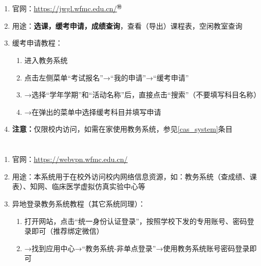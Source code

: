 \section[教务系统]{\textbf{}}
\begin{enumerate}
      \item 官网：\uline{\href{https://jwgl.wfmc.edu.cn/}{https://jwgl.wfmc.edu.cn/}$^㊕$}
      \item 用途：\textbf{选课，缓考申请，成绩查询}，查看（导出）课程表，空闲教室查询
      \item 缓考申请教程：
            \begin{enumerate}
                  \item 进入教务系统
                  \item 点击左侧菜单“考试报名”→“我的申请”→“缓考申请”
                  \item →选择“学年学期”和“活动名称”后，直接点击“搜索”（不要填写科目名称）
                  \item →在弹出的菜单中选择缓考科目并填写申请\footnotemark
            \end{enumerate}
      \item \textbf{注意：}仅限校内访问，如需在家使用教务系统，参见\uline{\ref{cas_system}}条目
\end{enumerate}

\section[资源访问控制系统（校内VPN）]{\textbf{}\footnotemark}
\label{cas_system}
\begin{enumerate}
      \item 官网：\uline{\href{https://webvpn.wfmc.edu.cn/}{https://webvpn.wfmc.edu.cn/}}
      \item 用途：本系统用于在校外访问校内网络信息资源，如：教务系统（查成绩、课表）、知网、临床医学虚拟仿真实验中心\footnotemark 等
      \item 异地登录教务系统教程（其它系统同理）：
            \begin{enumerate}
                  \item 打开网站，点击“统一身份认证登录”，按照学校下发的专用账号、密码登录即可（推荐绑定微信）
                  \item →找到应用中心→“教务系统-非单点登录”\footnotemark →使用教务系统账号密码登录即可
            \end{enumerate}
\end{enumerate}

